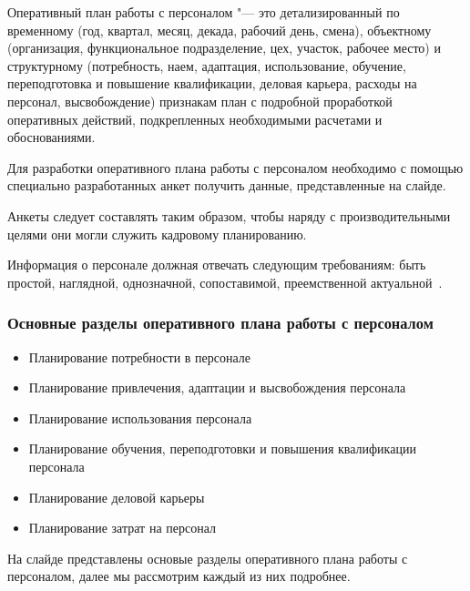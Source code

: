 \documentclass{../industrial-development}
\begin{document}
\alert{Оперативный план работы с персоналом} "--- это детализированный по временному (год, квартал, месяц, декада, рабочий день, смена), объектному (организация, функциональное подразделение, цех, участок, рабочее место) и структурному (потребность, наем, адаптация, использование, обучение, переподготовка и повышение квалификации, деловая карьера, расходы на персонал, высвобождение) признакам план с подробной проработкой оперативных действий, подкрепленных необходимыми расчетами и обоснованиями.

Для разработки оперативного плана работы с персоналом необходимо с помощью специально разработанных анкет получить данные, представленные на слайде.

Анкеты следует составлять таким образом, чтобы наряду с производительными целями они могли служить кадровому планированию.

Информация о персонале должная отвечать следующим требованиям:
быть простой, наглядной, однозначной, сопоставимой, преемственной 
актуальной~\cite[с.~87--88]{Ivanova}.

\begin{frame} \frametitle{Основные разделы оперативного плана работы с персоналом}

  \begin{itemize}

 \item Планирование потребности в персонале
\item Планирование привлечения, адаптации и высвобождения персонала
\item  Планирование использования персонала
\item  Планирование обучения, переподготовки и повышения квалификации персонала
\item Планирование деловой карьеры
\item Планирование затрат на персонал
	  \end{itemize}	  

\end{frame}

\lecturenotes

На слайде представлены основые разделы оперативного плана работы с персоналом, далее мы рассмотрим каждый из них подробнее.
\end{document}
